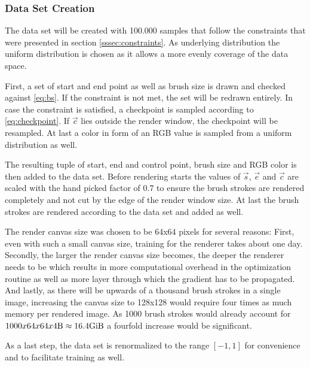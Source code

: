 
\subsubsection{Data Set Creation}

The data set will be created with 100.000 samples that follow the constraints that
were presented in section \ref{sssec:constraints}.
As underlying distribution the uniform distribution is chosen as it allows a more
evenly coverage of the data space.

First, a set of start and end point as well as brush size is drawn and checked against
\eqref{eq:bs}.
If the constraint is not met, the set will be redrawn entirely.
In case the constraint is satisfied, a checkpoint is sampled according to \eqref{eq:checkpoint}.
If $\vec{c}$ lies outside the render window, the checkpoint will be resampled.
At last a color in form of an RGB value is sampled from a uniform distribution as well.

The resulting tuple of start, end and control point, brush size and RGB color is then
added to the data set.
Before rendering starts the values of $\vec{s}$, $\vec{e}$ and $\vec{c}$ are scaled
with the hand picked factor of $0.7$ to ensure the brush strokes are rendered completely
and not cut by the edge of the render window size.
At last the brush strokes are rendered according to the data set and added as well.

The render canvas size was chosen to be 64x64 pixels for several reasons:
First, even with such a small canvas size, training for the renderer takes about
one day.
Secondly, the larger the render canvas size becomes, the deeper the renderer needs
to be which results in more computational overhead in the optimization routine as
well as more layer through which the gradient has to be propagated.
And lastly, as there will be upwards of a thousand brush strokes in a single image,
increasing the canvas size to 128x128 would require four times as much memory per
rendered image. As 1000 brush strokes would already account for
$1000 x 64 x 64 x 4 \si{\byte} \approx 16.4 \si{\gibi \byte}$ a fourfold increase
would be significant.


As a last step, the data set is renormalized to the range $[-1, 1]$ for convenience
and to facilitate training as well.


